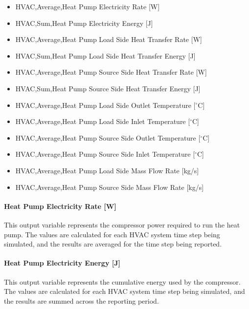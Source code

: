 \begin{itemize}
    \item
    HVAC,Average,Heat Pump Electricity Rate {[}W{]}
    \item
    HVAC,Sum,Heat Pump Electricity Energy {[}J{]}
    \item
    HVAC,Average,Heat Pump Load Side Heat Transfer Rate {[}W{]}
    \item
    HVAC,Sum,Heat Pump Load Side Heat Transfer Energy {[}J{]}
    \item
    HVAC,Average,Heat Pump Source Side Heat Transfer Rate {[}W{]}
    \item
    HVAC,Sum,Heat Pump Source Side Heat Transfer Energy {[}J{]}
    \item
    HVAC,Average,Heat Pump Load Side Outlet Temperature {[}$^\circ$C{]}
    \item
    HVAC,Average,Heat Pump Load Side Inlet Temperature {[}$^\circ$C{]}
    \item
    HVAC,Average,Heat Pump Source Side Outlet Temperature {[}$^\circ$C{]}
    \item
    HVAC,Average,Heat Pump Source Side Inlet Temperature {[}$^\circ$C{]}
    \item
    HVAC,Average,Heat Pump Load Side Mass Flow Rate {[}kg/s{]}
    \item
    HVAC,Average,Heat Pump Source Side Mass Flow Rate {[}kg/s{]}
\end{itemize}

\paragraph{Heat Pump Electricity Rate {[}W{]}}\label{water-to-water-heat-pump-electric-power-w-1}

This output variable represents the compressor power required to run the heat pump. The values are calculated for each HVAC system time step being simulated, and the results are averaged for the time step being reported.

\paragraph{Heat Pump Electricity Energy {[}J{]}}\label{water-to-water-heat-pump-electric-energy-j-1}

This output variable represents the cumulative energy used by the compressor. The values are calculated for each HVAC system time step being simulated, and the results are summed across the reporting period.

